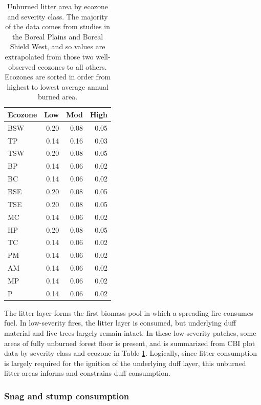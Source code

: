 \documentclass[, manuscript]{copernicus}
\begin{document}
\begin{table}
\centering
\caption{\label{tab:tab-UnBurnedForestFloorByEcozone}Unburned litter area by ecozone and severity class.  The majority of the data comes from studies in the Boreal Plains and Boreal Shield West, and so values are extrapolated from those two well-observed ecozones to all others.  Ecozones are sorted in order from highest to lowest average annual burned area.}
\centering
\begin{tabular}[t]{l|r|r|r}
\hline
Ecozone & Low & Mod & High\\
\hline
BSW & 0.20 & 0.08 & 0.05\\
\hline
TP & 0.14 & 0.16 & 0.03\\
\hline
TSW & 0.20 & 0.08 & 0.05\\
\hline
BP & 0.14 & 0.06 & 0.02\\
\hline
BC & 0.14 & 0.06 & 0.02\\
\hline
BSE & 0.20 & 0.08 & 0.05\\
\hline
TSE & 0.20 & 0.08 & 0.05\\
\hline
MC & 0.14 & 0.06 & 0.02\\
\hline
HP & 0.20 & 0.08 & 0.05\\
\hline
TC & 0.14 & 0.06 & 0.02\\
\hline
PM & 0.14 & 0.06 & 0.02\\
\hline
AM & 0.14 & 0.06 & 0.02\\
\hline
MP & 0.14 & 0.06 & 0.02\\
\hline
P & 0.14 & 0.06 & 0.02\\
\hline
\end{tabular}
\end{table}

The litter layer forms the first biomass pool in which a spreading fire
consumes fuel. In low-severity fires, the litter layer is consumed, but
underlying duff material and live trees largely remain
intact\citep{hessburg2019}. In these low-severity patches, some areas of
fully unburned forest floor is present, and is summarized from CBI plot
data by severity class and ecozone in Table
\ref{tab:tab-UnBurnedForestFloorByEcozone}. Logically, since litter
consumption is largely required for the ignition of the underlying duff
layer, this unburned litter areas informs and constrains duff
consumption.

\subsubsection{Snag and stump consumption}
\end{document}
